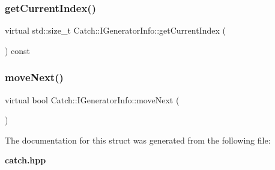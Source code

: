 \subsubsection{get\+Current\+Index()}
{\footnotesize\ttfamily virtual std\+::size\+\_\+t Catch\+::\+I\+Generator\+Info\+::get\+Current\+Index (\begin{DoxyParamCaption}{ }\end{DoxyParamCaption}) const\hspace{0.3cm}{\ttfamily [pure virtual]}}

\mbox{\label{struct_catch_1_1_i_generator_info_a2b86711ca7009903edfe27ed62b515ef}} 
\subsubsection{move\+Next()}
{\footnotesize\ttfamily virtual bool Catch\+::\+I\+Generator\+Info\+::move\+Next (\begin{DoxyParamCaption}{ }\end{DoxyParamCaption})\hspace{0.3cm}{\ttfamily [pure virtual]}}



The documentation for this struct was generated from the following file\+:\begin{DoxyCompactItemize}
\item 
\textbf{ catch.\+hpp}\end{DoxyCompactItemize}
